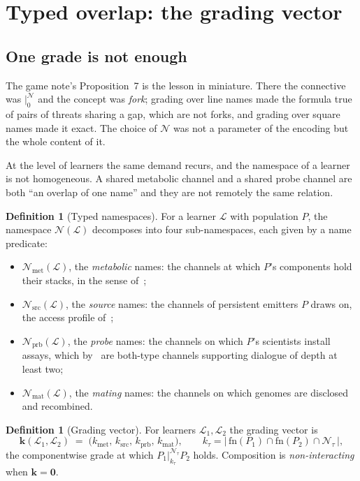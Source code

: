\documentclass[11pt,a4paper]{article}
\theoremstyle{plain}
\theoremstyle{definition}
\newtheorem{definition}[theorem]{Definition}
\theoremstyle{remark}
\newcommand{\Lrn}{\mathcal{L}}
\newcommand{\Nsp}{\mathcal{N}}
\newcommand{\Met}{\Nsp_{\mathrm{met}}}
\newcommand{\Src}{\Nsp_{\mathrm{src}}}
\newcommand{\Prb}{\Nsp_{\mathrm{prb}}}
\newcommand{\Mat}{\Nsp_{\mathrm{mat}}}
\newcommand{\sep}[2]{\mathbin{\big|^{#1}_{#2}}}
\newcommand{\fn}{\mathrm{fn}}
\begin{document}
\section{Typed overlap: the grading vector}\label{sec:typed}

\subsection{One grade is not enough}

The game note's Proposition~7 is the lesson in miniature. There the connective was
$\sep{\Nsp}{0}$ and the concept was \emph{fork}; grading over line names made the formula true of
pairs of threats sharing a gap, which are not forks, and grading over square names made it exact.
The choice of $\Nsp$ was not a parameter of the encoding but the whole content of it.

At the level of learners the same demand recurs, and the namespace of a learner is not
homogeneous. A shared metabolic channel and a shared probe channel are both ``an overlap of one
name'' and they are not remotely the same relation.

\begin{definition}[Typed namespaces]\label{def:typed}
For a learner $\Lrn$ with population $P$, the namespace $\Nsp(\Lrn)$ decomposes into four
sub-namespaces, each given by a name predicate:
\begin{itemize}[itemsep=2pt]
\item $\Met(\Lrn)$, the \emph{metabolic} names: the channels at which $P$'s components hold their
stacks, in the sense of~\cite[Def.~21]{scientist};
\item $\Src(\Lrn)$, the \emph{source} names: the channels of persistent emitters $P$ draws on,
the access profile of~\cite[Def.~39]{scientist};
\item $\Prb(\Lrn)$, the \emph{probe} names: the channels on which $P$'s scientists install
assays, which by~\cite[\S12.6]{scientist} are both-type channels supporting dialogue of depth at
least two;
\item $\Mat(\Lrn)$, the \emph{mating} names: the channels on which genomes are disclosed and
recombined.
\end{itemize}
\end{definition}

\begin{definition}[Grading vector]\label{def:vector}
For learners $\Lrn_1,\Lrn_2$ the grading vector is
\[
  \mathbf{k}(\Lrn_1,\Lrn_2) \;=\;
  \bigl(k_{\mathrm{met}},\, k_{\mathrm{src}},\, k_{\mathrm{prb}},\, k_{\mathrm{mat}}\bigr),
  \qquad
  k_{\tau} = \bigl|\, \fn(P_1)\cap \fn(P_2) \cap \Nsp_{\tau} \,\bigr| ,
\]
the componentwise grade at which $P_1 \sep{\Nsp_\tau}{k_\tau} P_2$ holds. Composition is
\emph{non-interacting} when $\mathbf{k} = \mathbf{0}$.
\end{definition}
\end{document}
